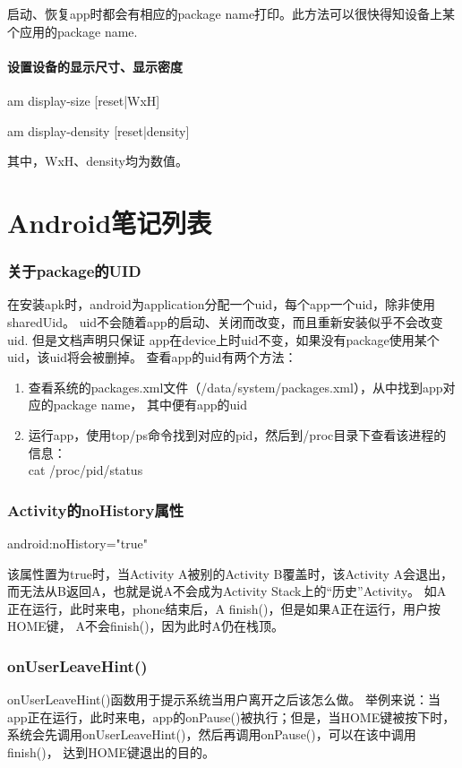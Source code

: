 ﻿\documentclass[a4paper,10pt]{article}
\begin{document}
  启动、恢复app时都会有相应的package name打印。此方法可以很快得知设备上某个应用的package name.

  \subsection[设置设备的显示尺寸、显示密度]{设置设备的显示尺寸、显示密度}
  am display-size [reset|WxH]

  am display-density [reset|density]

  其中，WxH、density均为数值。

  \part[Android Notes List]{Android笔记列表}
  \section[关于package的UID]{关于package的UID}
  在安装apk时，android为application分配一个uid，每个app一个uid，除非使用sharedUid。
	uid不会随着app的启动、关闭而改变，而且重新安装似乎不会改变uid. 但是文档声明只保证
	app在device上时uid不变，如果没有package使用某个uid，该uid将会被删掉。
	查看app的uid有两个方法：
  \begin{enumerate}
    \item 查看系统的packages.xml文件（/data/system/packages.xml），从中找到app对应的package name，
		      其中便有app的uid
    \item 运行app，使用top/ps命令找到对应的pid，然后到/proc目录下查看该进程的信息：\\
      		cat /proc/\lt pid\gt/status
  \end{enumerate}

  \section[Activity的noHistory属性]{Activity的noHistory属性}
  android:noHistory="true"

  该属性置为true时，当Activity A被别的Activity B覆盖时，该Activity A会退出，
  而无法从B返回A，也就是说A不会成为Activity Stack上的“历史”Activity。
  如A正在运行，此时来电，phone结束后，A finish()，但是如果A正在运行，用户按HOME键，
  A不会finish()，因为此时A仍在栈顶。

  \section[onUserLeaveHint()]{onUserLeaveHint()}
  onUserLeaveHint()函数用于提示系统当用户离开之后该怎么做。
  举例来说：当app正在运行，此时来电，app的onPause()被执行；但是，当HOME键被按下时，
  系统会先调用onUserLeaveHint()，然后再调用onPause()，可以在该中调用finish()，
  达到HOME键退出的目的。
\end{document}
